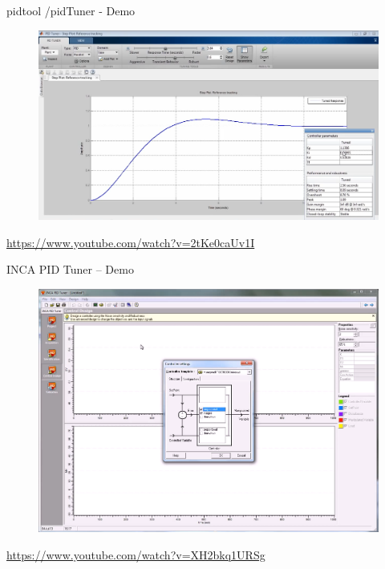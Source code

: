 \begin{frame}{pidtool /pidTuner - Demo}
	\begin{figure}
		\centering
		\includegraphics[width=0.7\linewidth]{img/pid_tool}
	\end{figure}
	\url{https://www.youtube.com/watch?v=2tKe0caUv1I}
\end{frame}

\begin{frame}{INCA PID Tuner – Demo}
	\begin{figure}
		\centering
		\includegraphics[width=0.7\linewidth]{img/inca_tunner}
	\end{figure}
	\url{https://www.youtube.com/watch?v=XH2bkq1URSg}
\end{frame}